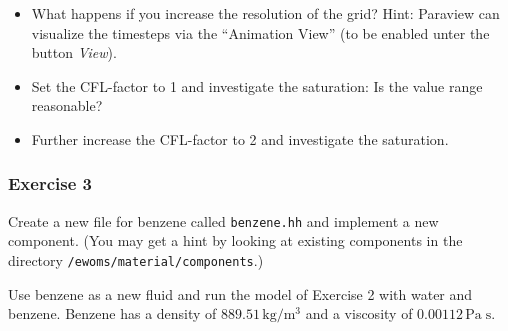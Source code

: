 \begin{itemize}
 \item What happens if you increase the resolution of the grid? Hint: Paraview can visualize the timesteps via the ``Animation View'' (to be enabled unter the button \textit{View}).
 \item Set the CFL-factor to 1 and investigate the saturation: Is the value range reasonable?
 \item Further increase the CFL-factor to 2 and investigate the saturation.
\end{itemize}

\subsubsection{Exercise 3}
Create a new file for benzene called \texttt{benzene.hh} and implement
a new component. (You may get a hint by looking at existing components
in the directory \verb+/ewoms/material/components+.)

Use benzene as a new fluid and run the model of Exercise 2 with water
and benzene. Benzene has a density of $889.51 \, \text{kg} / \text{m}^3$
and a viscosity of $0.00112 \, \text{Pa} \; \text{s}$. 

